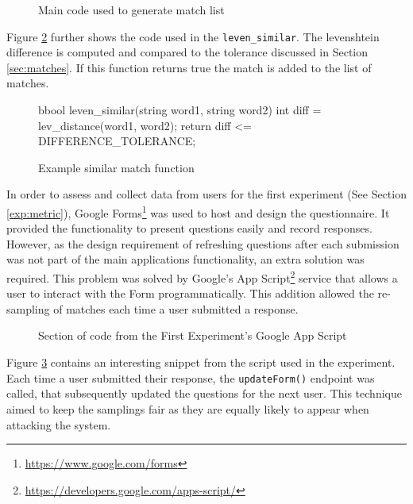 \begin{figure}[h!]
  \centering
  
  \caption{Main code used to generate match list}
  \label{fig:trustwordMatch}
\end{figure}

Figure \ref{fig:matchExample} further shows the code used in the \verb|leven_similar|. The levenshtein difference is computed and compared to the tolerance discussed in Section \ref{sec:matches}. If this function returns true the match is added to the list of matches.

\begin{figure}[h!]
\begin{Code}[CppStyle]
bbool leven_similar(string word1, string word2)
{
  int diff = lev_distance(word1, word2);
  return diff <= DIFFERENCE_TOLERANCE;
}
\end{Code}
\caption{Example similar match function}
\label{fig:matchExample}
\end{figure}

\newpage

In order to assess and collect data from users for the first experiment (See Section \ref{exp:metric}), Google Forms\footnote{\url{https://www.google.com/forms}} was used to host and design the questionnaire. It provided the functionality to present questions easily and record responses. However, as the design requirement of refreshing questions after each submission was not part of the main applications functionality, an extra solution was required. This problem was solved by Google's App Script\footnote{\url{https://developers.google.com/apps-script/}} service that allows a user to interact with the Form programmatically. This addition allowed the re-sampling of matches  each time a user submitted a response. 

\begin{figure}[!h]
  \centering
  
\caption{Section of code from the First Experiment's Google App Script}
\label{fig:GoogleAppScript}
\end{figure}

Figure \ref{fig:GoogleAppScript} contains an interesting snippet from the script used in the experiment. Each time a user submitted their response, the \verb|updateForm()| endpoint was called, that subsequently updated the questions for the next user. This technique aimed to keep the samplings fair as they are equally likely to appear when attacking the system.

\newpage

